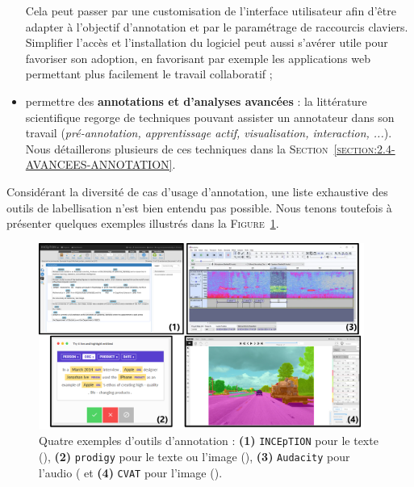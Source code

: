 \begin{itemize}
				Cela peut passer par une customisation de l'interface utilisateur afin d'être adapter à l'objectif d'annotation et par le paramétrage de raccourcis claviers.
				Simplifier l'accès et l'installation du logiciel peut aussi s'avérer utile pour favoriser son adoption, en favorisant par exemple les applications web permettant plus facilement le travail collaboratif ;
			\item permettre des \textbf{annotations et d'analyses avancées} :
				la littérature scientifique regorge de techniques pouvant assister un annotateur dans son travail (\textit{pré-annotation, apprentissage actif, visualisation, interaction, ...}).
				Nous détaillerons plusieurs de ces techniques dans la \textsc{Section~\ref{section:2.4-AVANCEES-ANNOTATION}}.
		\end{itemize}
		
		Considérant la diversité de cas d'usage d'annotation, une liste exhaustive des outils de labellisation n'est bien entendu pas possible.
		Nous tenons toutefois à présenter quelques exemples illustrés dans la \textsc{Figure~\ref{figure:2.2.3-ORGANISATION-ANNOTATION-LOGICIELS}}.
		\begin{figure}[!htb]
			\centering
			\includegraphics[width=0.95\textwidth]{figures/etatdelart-logiciel-exemples}
			\caption{
				Quatre exemples d'outils d'annotation :
				\textbf{(1)} \texttt{INCEpTION} pour le texte (\cite{klie-etal:2018:inception-platform-machineassisted}),
				\textbf{(2)} \texttt{prodigy} pour le texte ou l'image (\cite{montani-honnibal:2017:prodigy-modern-scriptable}),
				\textbf{(3)} \texttt{Audacity} pour l'audio (\cite{audacity-team:2000:audacity-free-audio}
				et \textbf{(4)} \texttt{CVAT} pour l'image (\cite{cvat.ai-corporation:2019:computer-vision-annotation}).
			}
			\label{figure:2.2.3-ORGANISATION-ANNOTATION-LOGICIELS}
		\end{figure}
		
